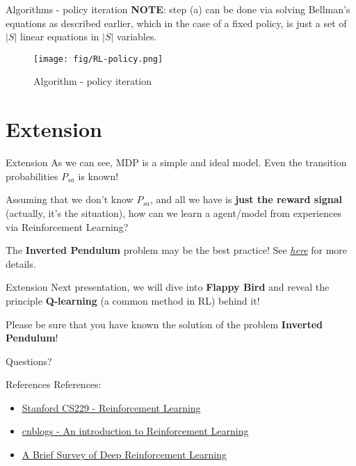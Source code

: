 \documentclass[10pt]{beamer}
\begin{document}
\begin{frame}[fragile]{Algorithms - policy iteration}
  \textbf{NOTE}: step (a) can be done via solving Bellman's equations as described earlier, which in the case of a fixed policy, is just a set of $|S|$ linear equations in $|S|$ variables.

  \begin{figure}[htbp]
    \centering
    \texttt{[image: fig/RL-policy.png]}
    \caption{Algorithm - policy iteration}
  \end{figure}
\end{frame}

\section{Extension}

\begin{frame}{Extension}
  As we can see, MDP is a simple and ideal model. Even the transition probabilities $P_{sa}$ is known!

  Assuming that we don't know $P_{sa}$, and all we have is \textbf{just the reward signal} (actually, it's the situation), \alert{how can we learn a agent/model from experiences via Reinforcement Learning?}

  The \textbf{Inverted Pendulum} problem may be the best practice! See \href{https://github.com/zyxue/stanford-cs229/tree/master/Problem-set-4/6-reinforcement-learning-the-inverted-pendulum}{\textit{here}} for more details.
\end{frame}

\begin{frame}{Extension}
  Next presentation, we will dive into \textbf{Flappy Bird} and reveal the principle \textbf{Q-learning} (a common method in RL) behind it!

  Please be sure that you have known the solution of the problem \textbf{Inverted Pendulum}!
\end{frame}

\begin{frame}[standout]
  Questions?
\end{frame}

\begin{frame}{References}
  References:
  \begin{itemize}
    \item \href{http://cs229.stanford.edu/syllabus.html}{Stanford CS229 - Reinforcement Learning}
    \item \href{https://www.cnblogs.com/yifdu25/p/8169226.html}{cnblogs - An introduction to Reinforcement Learning}
    \item \href{https://arxiv.org/abs/1708.05866}{A Brief Survey of Deep Reinforcement Learning}
  \end{itemize}
\end{frame}
\end{document}
